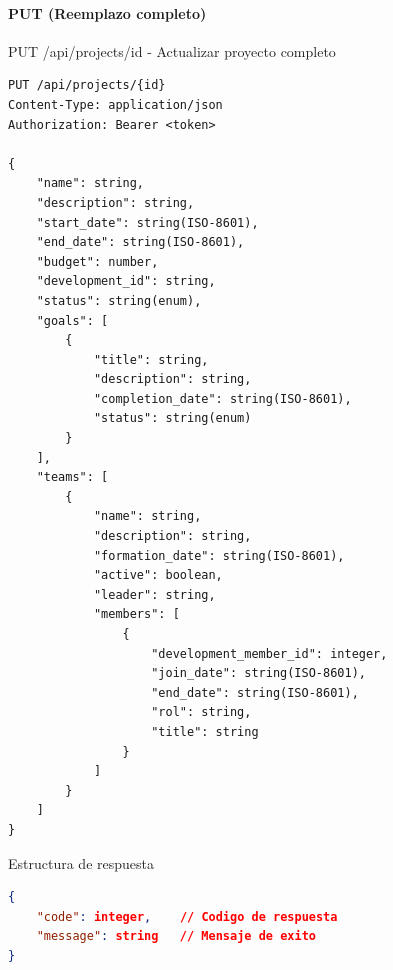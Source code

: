 \documentclass[11pt,a4paper]{article}
\begin{document}
\paragraph{PUT (Reemplazo completo)}
\begin{center}
	\begin{minipage}{\textwidth}
		\begin{codebox}{PUT /api/projects/{id} - Actualizar proyecto completo}
			\begin{lstlisting}[language=HTTP]
PUT /api/projects/{id}
Content-Type: application/json
Authorization: Bearer <token>

{
    "name": string,
    "description": string,
    "start_date": string(ISO-8601),
    "end_date": string(ISO-8601),
    "budget": number,
    "development_id": string,
    "status": string(enum),
    "goals": [
        {
            "title": string,
            "description": string,
            "completion_date": string(ISO-8601),
            "status": string(enum)
        }
    ],
    "teams": [
        {
            "name": string,
            "description": string,
            "formation_date": string(ISO-8601),
            "active": boolean,
            "leader": string,
            "members": [
                {
                    "development_member_id": integer,
                    "join_date": string(ISO-8601),
                    "end_date": string(ISO-8601),
                    "rol": string,
                    "title": string
                }
            ]
        }
    ]
}
\end{lstlisting}
		\end{codebox}
	\end{minipage}
\end{center}

\begin{center}
	\begin{minipage}{\textwidth}
		\begin{codebox}{Estructura de respuesta}
			\begin{lstlisting}[language=json]
{
    "code": integer,    // Codigo de respuesta
    "message": string   // Mensaje de exito
}
\end{lstlisting}
		\end{codebox}
	\end{minipage}
\end{center}
\end{document}
